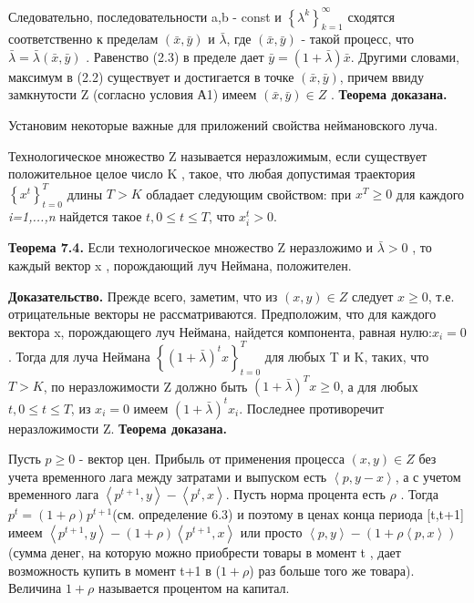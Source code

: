 \documentclass[12pt, 4paper]{book}
\begin{document}
{Следовательно, последовательности a,b - const и $\left\{\lambda^k \right\}_{k=1}^{\infty}$ сходятся соответственно к пределам $(\bar{x},\bar{y})$ и $\bar{\lambda}$, где $(\bar{x},\bar{y})$ - такой процесс, что $\bar{\lambda}=\bar{\lambda}(\bar{x},\bar{y})$ . Равенство (2.3) в пределе дает $\bar{y}=(1+\bar{\lambda})\bar{x}$. Другими словами, максимум в (2.2) существует и достигается в точке $(\bar{x},\bar{y})$, причем ввиду замкнутости Z (согласно условия А1) имеем $(\bar{x},\bar{y})\in Z$ .\textbf{ Теорема доказана.}
\par

Установим некоторые важные для приложений свойства неймановского луча.
\par

Технологическое множество Z называется неразложимым, если существует положительное целое число K , такое, что любая допустимая траектория $\left\{x^t\right\}_{t=0}^{T}$ длины $T>K$ обладает следующим свойством: при $x^T \geq 0$ для каждого \textit{i=1,...,n} найдется такое $t,0 \leq t\leq T  $, что $x_{i}^{t} > 0$.
\par

\textbf{Теорема 7.4.} Если технологическое множество Z неразложимо и $\bar{\lambda}>0$ , то каждый вектор x , порождающий луч Неймана, положителен.
\par

\textbf{Доказательство.} Прежде всего, заметим, что из $(x,y) \in Z$ следует $x \geq 0$, т.е. отрицательные векторы не рассматриваются. Предположим, что для каждого вектора x, порождающего луч Неймана, найдется компонента, равная нулю:$x_i = 0$ . Тогда для луча Неймана $\left\{(1+\bar{\lambda})^t x \right\}_{t=0}^{T}$ для любых T и K, таких, что $T > K$, по неразложимости Z должно быть $(1+ \bar{\lambda})^T x \geq 0$, а для любых $t,0 \leq t\leq T  $, из $x_i = 0$ имеем $(1+ \bar{\lambda})^t x_i$. Последнее противоречит неразложимости Z. \textbf{Теорема доказана.}
\par

Пусть $p \geq 0$ - вектор цен. Прибыль от применения процесса $(x,y) \in Z$ без учета временного лага между затратами и выпуском есть $\left\langle p,y-x \right\rangle$, а с учетом временного лага $\left\langle p^{t+1},y \right\rangle - \left\langle p^t,x\right\rangle$. Пусть норма процента есть $\rho$ . Тогда  $p^t = (1 + \rho)p^{t+1}$(см. определение 6.3) и поэтому в ценах конца периода [t,t+1] имеем $\left\langle p^{t+1},y \right\rangle - (1 + \rho) \left\langle p^{t+1},x\right\rangle$ или просто $\left\langle p,y\right\rangle - (1+ \rho \left\langle p,x\right\rangle)$  (сумма денег, на которую можно приобрести товары в момент t , дает возможность купить в момент t+1 в ($1 + \rho$) раз больше того же товара). Величина $1 + \rho$ называется процентом на капитал.
\par

}
\end{document}
